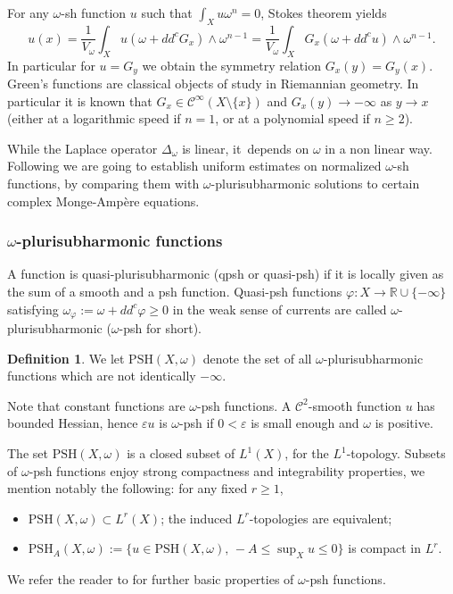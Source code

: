 \documentclass[JEP,XML,SOM,Unicode,published]{cedram}
\theoremstyle{definition}
\newtheorem{defi}[theorem]{Definition}
\newcommand{\R}{\mathbb R}
\let\e\varepsilon
\let\f\varphi
\newcommand \PSH {\mathrm{PSH}}
\begin{document}
For any $\omega$-sh function $u$ such that $\int_X u \omega^n=0$, Stokes theorem yields
\[
u(x)=\frac{1}{V_{\omega}} \int_X u(\omega+dd^c G_x) \wedge \omega^{n-1}=\frac{1}{V_{\omega}} \int_X G_x (\omega+dd^c u) \wedge \omega^{n-1}.
\]
In particular for $u=G_y$ we obtain the symmetry relation $G_x(y)=G_y(x)$.
Green's functions are classical objects of study in Riemannian geometry. In particular it is known
that $G_x \in {\mathcal C}^{\infty}(X \setminus \{x \})$ and $G_x(y) \rightarrow -\infty$ as
$y \rightarrow x$ (either at a logarithmic speed if $n=1$, or at a polynomial speed if $n \geq 2$).

While the Laplace operator $\Delta_{\omega}$ is linear, it~depends on $\omega$ in a non linear way.
Following \cite{GPS22,GPSS22,GPSS23} we are going to establish uniform estimates on normalized
$\omega$-sh functions, by comparing them with $\omega$-plurisubharmonic solutions to certain complex Monge-Ampère equations.

\subsubsection{$\omega$-plurisubharmonic functions}

A function is quasi-plurisub\-harmonic (qpsh or quasi-psh) if it is locally given as the sum of a smooth and a psh function.
Quasi-psh functions
$\f:X \rightarrow \R \cup \{-\infty\}$ satisfying
$
\omega_{\f}:=\omega+dd^c \f \geq 0
$
in the weak sense of currents are called $\omega$-plurisubharmonic ($\omega$-psh for short).

\begin{defi}
We let $\PSH(X,\omega)$ denote the set of all $\omega$-plurisubharmonic functions which are not identically $-\infty$.
\end{defi}

Note that constant functions are $\omega$-psh functions.
A ${\mathcal C}^2$-smooth function $u$ has bounded Hessian, hence $\e u$ is
$\omega$-psh if $0<\e$ is small enough and $\omega$ is positive.

The set $\PSH(X,\omega)$ is a closed subset of $L^1(X)$, for the $L^1$-topology.
Subsets of $\omega$-psh functions enjoy strong compactness and integrability properties,
we mention notably the following: for any fixed $r \geq 1$,
\begin{itemize}
\item $\PSH(X,\omega) \subset L^r(X)$;
the induced $L^r$-topologies are equivalent;
\item $\PSH_A(X,\omega):=\{ u \in\PSH(X,\omega), \, -A \leq \sup_X u \leq 0 \}$ is compact in $L^r$.
\end{itemize}
We refer the reader to \cite{Dem12,GZbook} for further basic properties of $\omega$-psh functions.
\end{document}
